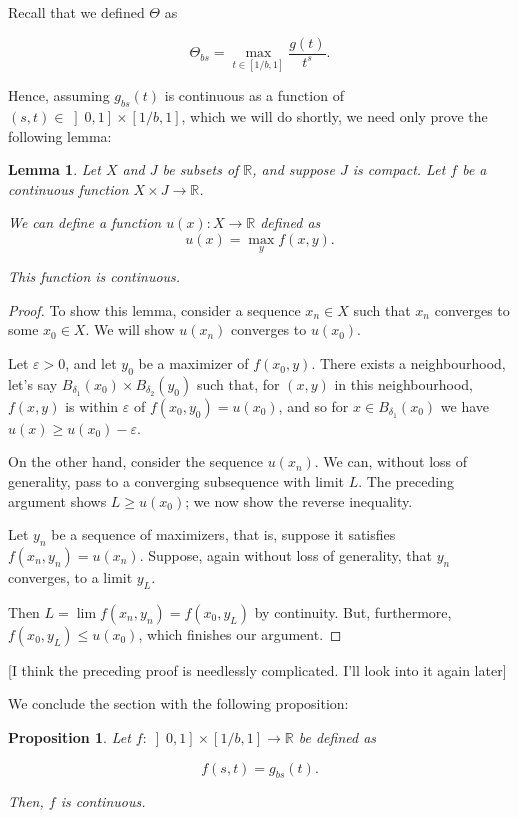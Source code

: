 \documentclass[11pt, reqno]{amsart}
\newcommand{\R}{\mathbb{R}}
\newtheorem{lemma}{Lemma}
\newtheorem{prop}{Proposition}
\begin{document}
Recall that we defined $\Theta$ as

\[ \Theta_{bs} = \max_{t \in \left[ 1/b, 1 \right]} \frac{g(t)}{t^s}.\]

Hence, assuming $g_{bs}(t)$ is continuous as a function of $(s, t) \in \left]0, 1\right] \times \left[1/b, 1\right]$, which we will do shortly, we need only prove the following lemma:

\begin{lemma}
Let $X$ and $J$ be subsets of $\R$, and suppose $J$ is compact. Let $f$ be a continuous function $X \times J \to \R$.

We can define a function $u(x) : X \to \R$ defined as
\[ u(x) = \max_y f(x,y).\]

This function is continuous.
\end{lemma}

\begin{proof}
To show this lemma, consider a sequence $x_n \in X$ such that $x_n$ converges to some $x_0 \in X$. We will show $u(x_n)$ converges to $u(x_0)$.

Let $\varepsilon > 0$, and let $y_0$ be a maximizer of $f(x_0, y)$. There exists a neighbourhood, let's say $B_{\delta_1}(x_0) \times B_{\delta_2}(y_0)$ such that, for $(x,y)$ in this neighbourhood, $f(x,y)$ is within $\varepsilon$ of $f(x_0, y_0) = u(x_0)$, and so for $x \in B_{\delta_1}(x_0)$ we have $u(x) \geq u(x_0) - \varepsilon$.

On the other hand, consider the sequence $u(x_n)$. We can, without loss of generality, pass to a converging subsequence with limit $L$. The preceding argument shows $L \geq u(x_0)$; we now show the reverse inequality.

Let $y_n$ be a sequence of maximizers, that is, suppose it satisfies $f(x_n, y_n) = u(x_n)$. Suppose, again without loss of generality, that $y_n$ converges, to a limit $y_L$.

Then $L = \lim f(x_n, y_n) = f(x_0, y_L)$ by continuity. But, furthermore, $f(x_0, y_L) \leq u(x_0)$, which finishes our argument.
\end{proof}

[I think the preceding proof is needlessly complicated. I'll look into it again later]

We conclude the section with the following proposition:

\begin{prop}
Let $f : \left]0, 1\right] \times \left[1/b, 1\right] \to \R$ be defined as

\[f(s, t) = g_{bs}(t).\]

Then, $f$ is continuous.
\end{prop}
\end{document}
